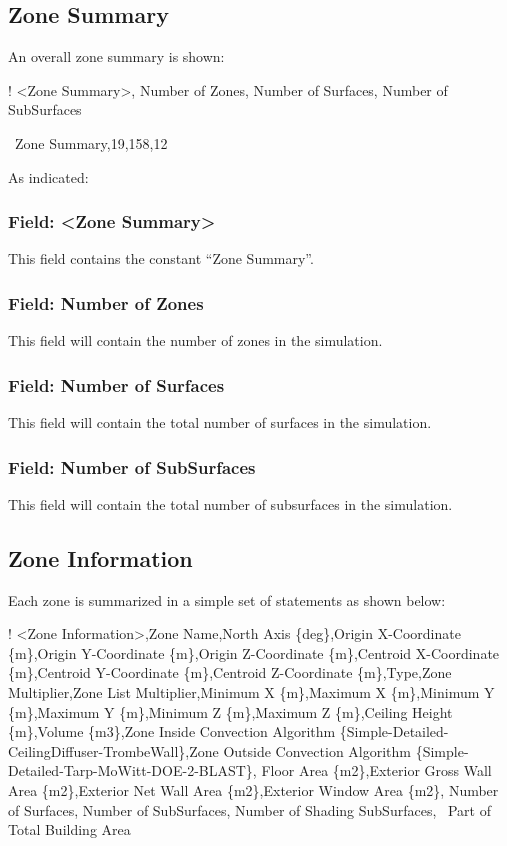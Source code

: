 \subsection{Zone Summary}\label{zone-summary}

An overall zone summary is shown:

! \textless{}Zone Summary\textgreater{}, Number of Zones, Number of Surfaces, Number of SubSurfaces

~Zone Summary,19,158,12

As indicated:

\subsubsection{Field: \textless{}Zone Summary\textgreater{}}\label{field-zone-summary}

This field contains the constant ``Zone Summary''.

\subsubsection{Field: Number of Zones}\label{field-number-of-zones}

This field will contain the number of zones in the simulation.

\subsubsection{Field: Number of Surfaces}\label{field-number-of-surfaces}

This field will contain the total number of surfaces in the simulation.

\subsubsection{Field: Number of SubSurfaces}\label{field-number-of-subsurfaces}

This field will contain the total number of subsurfaces in the simulation.

\subsection{Zone Information}\label{zone-information}

Each zone is summarized in a simple set of statements as shown below:

! \textless{}Zone Information\textgreater{},Zone Name,North Axis \{deg\},Origin X-Coordinate \{m\},Origin Y-Coordinate \{m\},Origin Z-Coordinate \{m\},Centroid X-Coordinate \{m\},Centroid Y-Coordinate \{m\},Centroid Z-Coordinate \{m\},Type,Zone Multiplier,Zone List Multiplier,Minimum X \{m\},Maximum X \{m\},Minimum Y \{m\},Maximum Y \{m\},Minimum Z \{m\},Maximum Z \{m\},Ceiling Height \{m\},Volume \{m3\},Zone Inside Convection Algorithm \{Simple-Detailed-CeilingDiffuser-TrombeWall\},Zone Outside Convection Algorithm \{Simple-Detailed-Tarp-MoWitt-DOE-2-BLAST\}, Floor Area \{m2\},Exterior Gross Wall Area \{m2\},Exterior Net Wall Area \{m2\},Exterior Window Area \{m2\}, Number of Surfaces, Number of SubSurfaces, Number of Shading SubSurfaces,~ Part of Total Building Area


